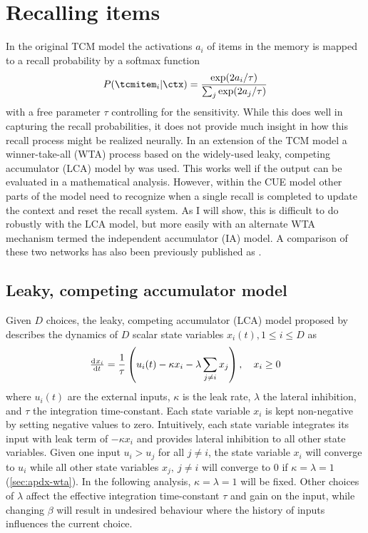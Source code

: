 \chapter{Recalling items}\label{sec:recall}
In the original TCM model \parencite{Howard2002} the activations $a_i$ of items in the memory is mapped to a recall probability by a softmax function
\begin{equation}
    P(\tcmitem_i | \ctx) = \frac{\exp(2a_i/\tau)}{\sum_j \exp(2a_j/\tau)}
\end{equation}
with a free parameter $\tau$ controlling for the sensitivity.
While this does well in capturing the recall probabilities, it does not provide much insight in how this recall process might be realized neurally.
In an extension of the TCM model \parencite{Sederberg2008} a winner-take-all (WTA) process based on the widely-used leaky, competing accumulator (LCA) model by \textcite{Usher2001} was used.
This works well if the output can be evaluated in a mathematical analysis.
However, within the CUE model other parts of the model need to recognize when a single recall is completed to update the context and reset the recall system.
As I will show, this is difficult to do robustly with the LCA model, but more easily with an alternate WTA mechanism termed the independent accumulator (IA) model.
A comparison of these two networks has also been previously published as \textcite{jangosmann2017}.


\section{Leaky, competing accumulator model}
Given $D$ choices, the leaky, competing accumulator (LCA) model proposed by \textcite{Usher2001} describes the dynamics of $D$ scalar state variables $x_i(t), 1 \leq i \leq D$ as
\begin{equation}
    \od{x_i}{t} = \frac{1}{\tau} \del{u_i(t) -\kappa x_i - \lambda \sum_{j \neq i} x_j}, \quad x_i \geq 0 \label{eqn:lca}
\end{equation}
where $u_i(t)$ are the external inputs, $\kappa$ is the leak rate, $\lambda$ the lateral inhibition, and $\tau$ the integration time-constant.
Each state variable $x_i$ is kept non-negative by setting negative values to zero.
Intuitively, each state variable integrates its input with leak term of $-\kappa x_i$ and provides lateral inhibition to all other state variables.
Given one input $u_i > u_j$ for all $j \neq i$, the state variable $x_i$ will converge to $u_i$ while all other state variables $x_j,\ j \neq i$ will converge to $0$ if $\kappa = \lambda = 1$ (\cref{sec:apdx-wta}).
In the following analysis, $\kappa = \lambda = 1$ will be fixed.
Other choices of $\lambda$ affect the effective integration time-constant $\tau$ and gain on the input, while changing $\beta$ will result in undesired behaviour where the history of inputs influences the current choice.


